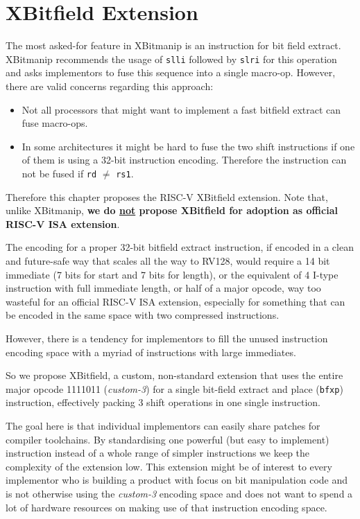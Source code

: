 \chapter{XBitfield Extension}
\label{bfxp}

The most asked-for feature in XBitmanip is an instruction for bit field
extract. XBitmanip recommends the usage of {\tt slli} followed by {\tt slri}
for this operation and asks implementors to fuse this sequence into a single
macro-op. However, there are valid concerns regarding this approach:

\begin{itemize}
\item Not all processors that might want to implement a fast bitfield extract
can fuse macro-ops.
\item In some architectures it might be hard to fuse the two shift instructions
if one of them is using a 32-bit instruction encoding. Therefore the instruction
can not be fused if {\tt rd} $\ne$ {\tt rs1}.
\end{itemize}

Therefore this chapter proposes the RISC-V XBitfield extension. Note that, unlike
XBitmanip, {\bf we do \underline{not} propose XBitfield for adoption as official RISC-V ISA extension}.

The encoding for a proper 32-bit bitfield extract instruction, if encoded
in a clean and future-safe way that scales all the way to RV128, would require
a 14 bit immediate (7 bits for start and 7 bits for length), or the equivalent
of 4 I-type instruction with full immediate length, or half of a major opcode,
way too wasteful for an official RISC-V ISA extension, especially for something
that can be encoded in the same space with two compressed instructions.

However, there is a tendency for implementors to fill the unused instruction
encoding space with a myriad of instructions with large immediates.~\cite{Ri5cy}

So we propose XBitfield, a custom, non-standard extension that uses the entire
major opcode 1111011 ({\it custom-3}) for a single bit-field extract and place
({\tt bfxp}) instruction, effectively packing 3 shift operations in one single
instruction.

The goal here is that individual implementors can easily share patches for
compiler toolchains. By standardising one powerful (but easy to implement)
instruction instead of a whole range of simpler instructions we keep the
complexity of the extension low. This extension might be of interest to
every implementor who is building a product with focus on bit manipulation
code and is not otherwise using the {\it custom-3} encoding space and does not
want to spend a lot of hardware resources on making use of that instruction
encoding space.


